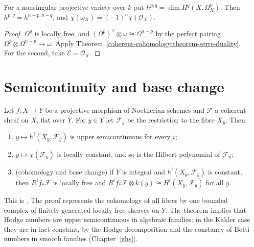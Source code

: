 \begin{corollary}\label{coherent-cohomology:corollary-hodge-symmetry-serre}
For a nonsingular projective variety over $k$ put $h^{p,q} = \dim H^q(X, \Omega^p_X)$. Then $h^{p,q} = h^{n-p,n-q}$, and $\chi(\omega_X) = (-1)^n\chi(\mathcal{O}_X)$.
\end{corollary}

\begin{proof}
$\Omega^p$ is locally free, and $(\Omega^p)^\vee \otimes \omega \cong \Omega^{n-p}$ by the perfect pairing $\Omega^p \otimes \Omega^{n-p} \to \omega$. Apply
Theorem~\ref{coherent-cohomology:theorem-serre-duality}. For the second, take $\mathcal{E} = \mathcal{O}_X$.
\end{proof}

\section{Semicontinuity and base change}\label{coherent-cohomology:section-base-change}

\begin{theorem}[Semicontinuity]\label{coherent-cohomology:theorem-semicontinuity}
Let $f \colon X \to Y$ be a projective morphism of Noetherian schemes and $\mathcal{F}$ a coherent sheaf on $X$, flat over $Y$. For $y \in Y$ let
$\mathcal{F}_y$ be the restriction to the fibre $X_y$. Then:
\begin{enumerate}
\item $y \mapsto h^i(X_y, \mathcal{F}_y)$ is upper semicontinuous for every $i$;
\item $y \mapsto \chi(\mathcal{F}_y)$ is locally constant, and so is the Hilbert polynomial of $\mathcal{F}_y$;
\item (cohomology and base change) if $Y$ is integral and $h^i(X_y, \mathcal{F}_y)$ is constant, then $R^if_*\mathcal{F}$ is locally free and
$R^if_*\mathcal{F} \otimes k(y) \cong H^i(X_y, \mathcal{F}_y)$ for all $y$.
\end{enumerate}
\end{theorem}

This is \cite[Theorem III.12.8, Corollary III.12.9 and Theorem III.9.9]{hartshorne-ag}. The proof represents the cohomology of all fibres by one bounded complex
of finitely generated locally free sheaves on $Y$. The theorem implies that Hodge numbers are upper semicontinuous in algebraic families; in the
K\"ahler case they are in fact constant, by the Hodge decomposition and the constancy of Betti numbers in smooth families (Chapter~\ref{vhs}).

